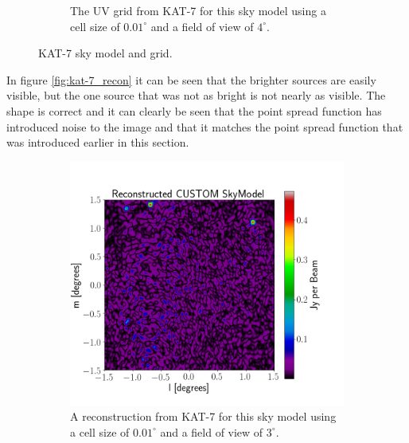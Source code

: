 \begin{figure}[H]
\begin{subfigure}[b]{0.49\textwidth}
    \caption{The UV grid from KAT-7 for this sky model using a cell size of $0.01^\circ$ and a 
    field of view of $4^\circ$.}
    \label{fig:kat-7_recon_grid}
  \end{subfigure}
  \caption{KAT-7 sky model and grid.}
  \label{fig:kat-7}
 \end{figure}

In figure \ref{fig:kat-7_recon} it can be seen that the brighter sources are easily visible, but the one source that was not as bright is not nearly as visible.  The shape is correct and it can clearly be seen that the point spread function has introduced noise to the image and that it matches the point spread function that was introduced earlier in this section.\\
\begin{figure}[H]
  \centering
  \begin{subfigure}[b]{0.49\textwidth}
    \centering
    \includegraphics[scale=0.3]{images/RECON_KAT_7_4_POINT_ALIASING.png}
    \caption{A reconstruction from KAT-7 for this sky model using a cell size of $0.01^\circ$ and a field of view of $3^\circ$.}
    \label{fig:kat-7_recon_alias}
  \end{subfigure}
  \begin{subfigure}[b]{0.49\textwidth}
    \centering

\end{subfigure}
\end{figure}
